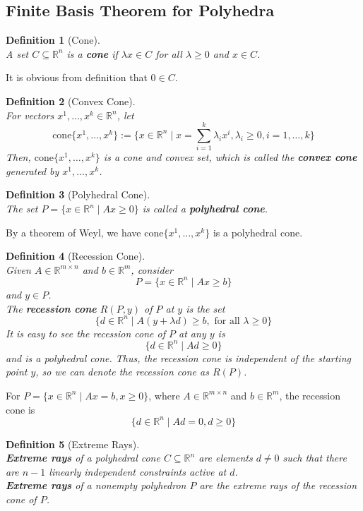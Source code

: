 \documentclass[12pt]{article}
\newcommand{\cone}{\mathrm{cone}}
\newtheorem{definition}{Definition}[section]
\theoremstyle{definition}
\begin{document}
\subsection{Finite Basis Theorem for Polyhedra}
\begin{definition}[Cone]
\hfill\\\normalfont A set $C\subseteq \mathbb{R}^n$ is a \textbf{cone} if $\lambda x\in C$ for all $\lambda\geq 0$ and $x\in C$.
\end{definition}
It is obvious from definition that $0\in C$.
\begin{definition}[Convex Cone]
\hfill\\\normalfont For vectors $x^1,\ldots, x^k\in \mathbb{R}^n$, let
\[
\cone\{x^1,\ldots, x^k\} := \{x\in\mathbb{R}^n \mid x=\sum_{i=1}^k \lambda_i x^i, \lambda_i\geq 0, i=1,\ldots, k\}
\]
Then, $\cone\{x^1,\ldots, x^k\}$ is a cone and convex set, which is called the \textbf{convex cone} generated by $x^1,\ldots, x^k$.
\end{definition}
\begin{definition}[Polyhedral Cone]
\hfill\\\normalfont The set $P=\{x\in \mathbb{R}^n\mid Ax\geq 0\}$ is called a \textbf{polyhedral cone}.
\end{definition}
By a theorem of Weyl, we have $\cone\{x^1,\ldots, x^k\}$ is a polyhedral cone.
\begin{definition}[Recession Cone]
\hfill\\\normalfont Given $A\in\mathbb{R}^{m\times n}$ and $b\in\mathbb{R}^m$, consider
\[
P=\{x\in\mathbb{R}^n\mid Ax\geq b\}
\] 
and $y\in P$.\\
The \textbf{recession cone} $R(P,y)$ of $P$ at $y$ is the set
\[
\{d\in\mathbb{R}^n \mid A(y+\lambda d)\geq b, \text{ for all } \lambda\geq 0\}
\]
It is easy to see the recession cone of $P$ at any $y$ is
\[
\{d\in\mathbb{R}^n\mid Ad\geq 0\}
\]
and is a polyhedral cone. Thus, the recession cone is independent of the starting point $y$, so we can denote the recession cone as $R(P)$.
\end{definition}
For $P=\{x\in\mathbb{R}^n \mid Ax=b,x\geq 0\}$, where $A\in \mathbb{R}^{m\times n}$ and $b\in\mathbb{R}^m$, the recession cone is
\[
\{d\in\mathbb{R}^n\mid Ad=0, d\geq 0\}
\]
\begin{definition}[Extreme Rays]
\hfill\\\normalfont \textbf{Extreme rays} of a polyhedral cone $C\subseteq \mathbb{R}^n$ are elements $d\neq 0$ such that there are $n-1$ linearly independent constraints active at $d$.\\
\textbf{Extreme rays} of a nonempty polyhedron $P$ are the extreme rays of the recession cone of $P$.
\end{definition}
\end{document}
